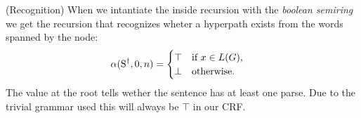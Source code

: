 \begin{example}{(Recognition)}
  When we intantiate the inside recursion with the \textit{boolean semiring} we get the recursion that recognizes wheter a hyperpath exists from the words spanned by the node:
  \begin{align*}
    \alpha(\text{S}^{\dagger}, 0, n) &= \begin{cases}
      \top & \mbox{if } x \in L(G),  \\
      \bot & \mbox{otherwise.}
  \end{cases}
  \end{align*}
  The value at the root tells wether the sentence has at least one parse. Due to the trivial grammar used this will always be $\top$ in our CRF.
\end{example}
